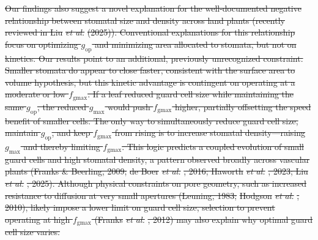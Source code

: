 \documentclass[
  letterpaper,
  DIV=11,
  numbers=noendperiod]{scrartcl}
\newcommand{\fgmax}{$f_\mathrm{gmax}$}
\newcommand{\gmax}{$g_\mathrm{max}$}
\newcommand{\gop}{$g_\mathrm{op}$}
\providecommand{\DIFdeltex}[1]{{\protect\color{red}\sout{#1}}}                      %
\providecommand{\DIFdelbegin}{} %
\providecommand{\DIFdel}[1]{\texorpdfstring{\DIFdeltex{#1}}{}} %
\newcommand{\DIFscaledelfig}{0.5}
\newlength{\DIFdelgraphicswidth} %
\newlength{\DIFdelgraphicsheight} %
\newcommand{\DIFdelincludegraphics}[2][]{%
\sbox{\DIFdelgraphicsbox}{\DIFOincludegraphics[#1]{#2}}%
\settoboxwidth{\DIFdelgraphicswidth}{\DIFdelgraphicsbox} %
\settoboxtotalheight{\DIFdelgraphicsheight}{\DIFdelgraphicsbox} %
\scalebox{\DIFscaledelfig}{%
\parbox[b]{\DIFdelgraphicswidth}{\usebox{\DIFdelgraphicsbox}\\[-\baselineskip] \rule{\DIFdelgraphicswidth}{0em}}\llap{\resizebox{\DIFdelgraphicswidth}{\DIFdelgraphicsheight}{%
\setlength{\unitlength}{\DIFdelgraphicswidth}%
\begin{picture}(1,1)%
\thicklines\linethickness{2pt} %
{\color[rgb]{1,0,0}\put(0,0){\framebox(1,1){}}}%
{\color[rgb]{1,0,0}\put(0,0){\line( 1,1){1}}}%
{\color[rgb]{1,0,0}\put(0,1){\line(1,-1){1}}}%
\end{picture}%
}\hspace*{3pt}}} %
} %
\DeclareRobustCommand{\DIFdelbegin}{\DIFOdelbegin \let\includegraphics\DIFdelincludegraphics} %
\begin{document}
\DIFdelbegin \DIFdel{Our findings also suggest a novel explanation for the well-documented
negative relationship between stomatal size and density across land
plants (recently reviewed in Liu }\emph{\DIFdel{et al.}} %
\DIFdel{(2025)). Conventional
explanations for this relationship focus on optimizing \gop{} and
minimizing area allocated to stomata, but not on kinetics.
Our results
point to an additional, previously unrecognized constraint. Smaller
stomata do appear to close faster, consistent with the surface area to
volume hypothesis, but this kinetic advantage is contingent on operating
at a moderate or low \fgmax{}. If a leaf reduced guard cell size while
maintaining the same \gop, the reduced \gmax{} would push \fgmax{}
higher, partially offsetting the speed benefit of smaller cells. The
only way to simultaneously reduce guard cell size, maintain \gop{}, and
keep \fgmax{} from rising is to increase stomatal density---raising
\gmax{} and thereby limiting \fgmax{}. This logic predicts a coupled
evolution of small guard cells and high stomatal density, a pattern
observed broadly across vascular plants (Franks \& Beerling, 2009; }%
\DIFdel{de
Boer }\emph{\DIFdel{et al.}}%
\DIFdel{, 2016; Haworth }\emph{\DIFdel{et al.}}%
\DIFdel{, 2023; Liu }\emph{\DIFdel{et
al.}}%
\DIFdel{, 2025). Although physical constraints on pore geometry, such as
increased resistance to diffusion at very small apertures (Leuning,
1983; }%
\DIFdel{Hodgson }\emph{\DIFdel{et al.}}%
\DIFdel{, 2010), likely impose a lower limit on
guard cell size, selection to prevent operating at high \fgmax{} (Franks
}\emph{\DIFdel{et al.}}%
\DIFdel{, 2012) may also explain why optimal guard cell size
varies.
}%
\end{document}

